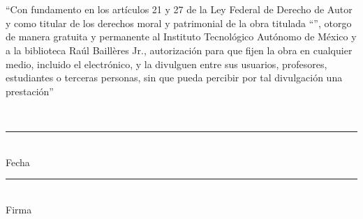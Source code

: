\thispagestyle{empty}
\chapter*{\phantom{Declaración}}
``Con fundamento en los artículos 21 y 27 de la Ley Federal de Derecho de Autor y como titular de los derechos moral y patrimonial de la obra titulada ``\textbf{\thetitle}'', otorgo de manera gratuita y permanente al Instituto Tecnológico Autónomo de México y a la biblioteca Raúl Baillères Jr., autorización para que fijen la obra en cualquier medio, incluido el electrónico, y la divulguen entre sus usuarios, profesores, estudiantes o terceras personas, sin que pueda percibir por tal divulgación una prestación''
    \\
    \begin{center}
        \theauthor\\
        \vspace{4em}
        \rule[0mm]{60mm}{0.1mm}\\
        Fecha\\
        \vspace{3em}
        \rule[0mm]{60mm}{0.1mm}\\
        Firma\\
    \end{center}
\clearpage